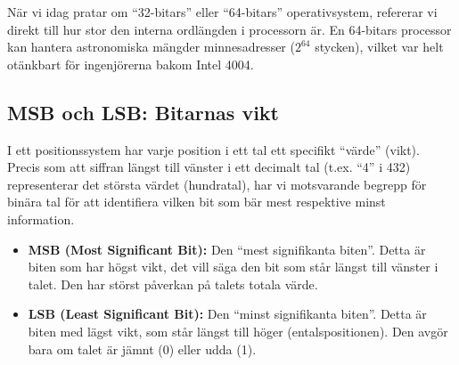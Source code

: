 \documentclass[
  swedish,
  letterpaper,
  oneside,
  openany]{book}
\providecommand{\tightlist}{%
  \setlength{\itemsep}{0pt}\setlength{\parskip}{0pt}}
\begin{document}
När vi idag pratar om ``32-bitars'' eller ``64-bitars'' operativsystem,
refererar vi direkt till hur stor den interna ordlängden i processorn
är. En 64-bitars processor kan hantera astronomiska mängder
minnesadresser (\(2^{64}\) stycken), vilket var helt otänkbart för
ingenjörerna bakom Intel 4004.

\subsection{MSB och LSB: Bitarnas vikt}\label{msb-och-lsb-bitarnas-vikt}

I ett positionssystem har varje position i ett tal ett specifikt
``värde'' (vikt). Precis som att siffran längst till vänster i ett
decimalt tal (t.ex. ``4'' i 432) representerar det största värdet
(hundratal), har vi motsvarande begrepp för binära tal för att
identifiera vilken bit som bär mest respektive minst information.

\begin{itemize}
\tightlist
\item
  \textbf{MSB (Most Significant Bit):} Den ``mest signifikanta biten''.
  Detta är biten som har högst vikt, det vill säga den bit som står
  längst till vänster i talet. Den har störst påverkan på talets totala
  värde.
\item
  \textbf{LSB (Least Significant Bit):} Den ``minst signifikanta
  biten''. Detta är biten med lägst vikt, som står längst till höger
  (entalspositionen). Den avgör bara om talet är jämnt (0) eller udda
  (1).
\end{itemize}
\end{document}
